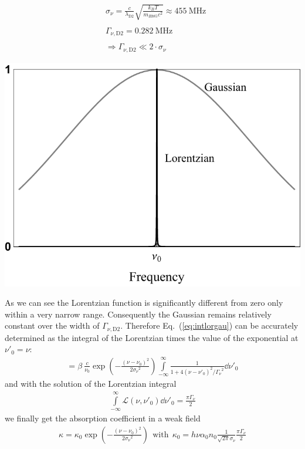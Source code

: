 \begin{minipage}[c][][c]{.45\textwidth}
\centering
\begin{align*}
    &\sigma_\nu = \frac{c}{\lambda_\mathrm{D2}} \sqrt{\frac{k_B T}{m_{Rb85} c^2}} \approx \SI{455}{\mega\hertz} \\ \\
    &\Gamma_{\nu,\mathrm{D2}} = \SI{0.282}{\mega\hertz} \\ \\
    &\Rightarrow \Gamma_{\nu,\mathrm{D2}} \ll 2\cdot\sigma_\nu
\end{align*}
\end{minipage}
\hfill
\begin{minipage}[c]{.45\textwidth}
\includegraphics[width=\textwidth]{gauvslor}
\end{minipage}
\bigskip

As we can see the Lorentzian function is significantly different from zero only within a very narrow range.
Consequently the Gaussian remains relatively constant over the width of \(\Gamma_{\nu,\mathrm{D2}} \).
Therefore Eq.~(\ref{eq:intlorgau}) can be accurately determined as the integral of the Lorentzian times the 
value of the exponential at \(\nu'_0 = \nu \):
\begin{align}
    = \beta~\frac{c}{\nu_0} \exp{ \left ( -\frac{{(\nu - \nu_0)}^2 }{2 {\sigma_\nu}^2 } \right )} 
    \int\limits_{-\infty}^{\infty} \frac{1}{ 1+4 {(\nu-\nu'_0)}^2 / {\Gamma_\nu}^2 } \dd \nu'_0
\end{align}
and with the solution of the Lorentzian integral
\begin{align}
    \int\limits_{-\infty}^{\infty} \mathcal{L}(\nu,\nu'_0) \dd \nu'_0 = \frac{\pi \Gamma_\nu}{2}
\end{align}
we finally get the absorption coefficient in a weak field
\begin{align}\label{eq:kappa_weakfield}
    \kappa = \kappa_0 \exp{ \left ( -\frac{{(\nu - \nu_0)}^2 }{2 {\sigma_\nu}^2 } \right )} ~~\text{with}~~ \kappa_0 = h\nu \alpha_0 n_0 \frac{1}{\sqrt{2\pi}\sigma_\nu} \frac{\pi \Gamma_\nu}{2}
\end{align}


